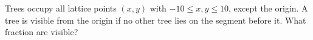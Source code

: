 Trees occupy all lattice points $(x,y)$ with $-10\le x,y\le10$, except the origin. A tree is visible from the origin if no other tree lies on the segment before it. What fraction are visible?
